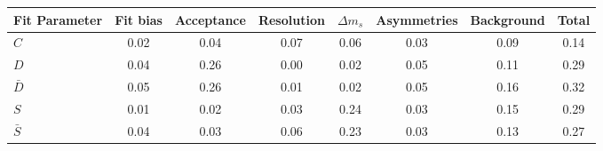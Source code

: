 \begin{tabular}{l  c  c  c  c  c  c  | c }
\hline
\hline
Fit Parameter & Fit bias & Acceptance & Resolution & $\Delta m_{s}$ & Asymmetries & Background &  Total  \\ 
\hline
$C$ & 0.02 & 0.04 & 0.07 & 0.06 & 0.03 & 0.09 & 0.14 \\ 
$D$ & 0.04 & 0.26 & 0.00 & 0.02 & 0.05 & 0.11 & 0.29 \\ 
$\bar{D}$ & 0.05 & 0.26 & 0.01 & 0.02 & 0.05 & 0.16 & 0.32 \\ 
$S$ & 0.01 & 0.02 & 0.03 & 0.24 & 0.03 & 0.15 & 0.29 \\ 
$\bar{S}$ & 0.04 & 0.03 & 0.06 & 0.23 & 0.03 & 0.13 & 0.27 \\ 
\hline
\hline
\end{tabular}
